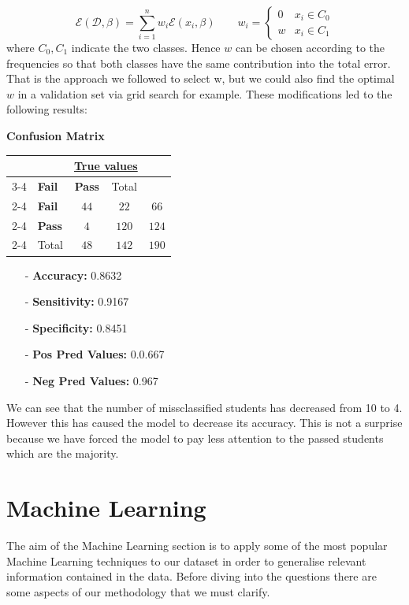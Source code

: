 \documentclass[a4paper, 11pt]{article}
\theoremstyle{definition}
\numberwithin{equation}{section}		%
\numberwithin{table}{section}				%
\begin{document}
\begin{equation}
\mathcal{E}(\mathcal{D}, \beta) = \sum_{i=1}^nw_i\mathcal{E}(x_i, \beta) \quad 
\quad w_i = \begin{cases}
0 & x_i \in C_0\\
w & x_i \in C_1
\end{cases}
\end{equation}
where $C_0, C_1$ indicate the two classes. Hence $w$ can be chosen according to the frequencies so that both classes have the same contribution into the total error. That is the approach we followed to select w, but we could also find the optimal $w$ in a validation set via grid search for example. These modifications led to the following results:
\begin{center}
    \textbf{Confusion Matrix}
\end{center}
\begin{tabular}{l|l|c|c|c}
\multicolumn{2}{c}{}&\multicolumn{2}{c}{\underline{True values}}&\\
\cline{3-4}
\multicolumn{2}{c|}{}&\textbf{Fail}&\textbf{Pass}&\multicolumn{1}{c}{Total}\\
\cline{2-4}
\multirow{\underline{\textit{Predicted Values}}}& \textbf{Fail} & $44$ & $22$ & $66$\\
\cline{2-4}
& \textbf{Pass} & $4$ & $120$ & $124$\\
\cline{2-4}
\multicolumn{1}{c}{} & \multicolumn{1}{c}{Total} & \multicolumn{1}{c}{$48$} & \multicolumn{    1}{c}{$142$} & \multicolumn{1}{c}{$190$}\\
\end{tabular}
\begin{itemize}
    \item[-] \textbf{Accuracy: } 0.8632
    \item[-] \textbf{Sensitivity: } 0.9167
    \item[-] \textbf{Specificity: } 0.8451
    \item[-] \textbf{Pos Pred Values: } 0.0.667
    \item[-] \textbf{Neg Pred Values: } 0.967
\end{itemize}
We can see that the number of missclassified students has decreased from 10 to 4. However this has caused the model to decrease its accuracy. This is not a surprise because we have forced the model to pay less attention to the passed students which are the majority.
\newpage

\section{Machine Learning}
The aim of the Machine Learning section is to apply some of the most popular Machine Learning techniques to our dataset in order to generalise relevant information contained in the data. Before diving into the questions there are some aspects of our methodology that we must clarify.\bigskip
\end{document}
